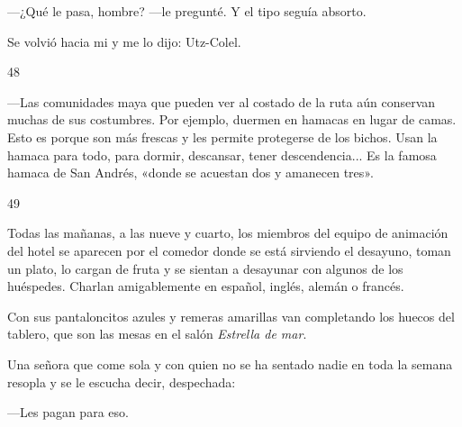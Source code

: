 \documentclass[12pt,twoside,openright,a5paper]{book}
\begin{document}
---¿Qué le pasa, hombre? ---le pregunté. Y el tipo seguía
absorto.

Se volvió hacia mi y me lo dijo: Utz-Colel.

\vspace{0.5cm}

\hrulefill \hspace{0.1cm}\decofourleft\hspace{0.2cm} 48 \hspace{0.2cm}\decofourright \hspace{0.1cm}\hrulefill

\nopagebreak

\vspace{0.5cm}

\nopagebreak

---Las comunidades maya que pueden ver al costado de la ruta aún conservan
muchas de sus costumbres. Por ejemplo, duermen en hamacas en lugar de
camas. Esto es porque son más frescas y les permite protegerse de los bichos. Usan la hamaca
para todo, para dormir, descansar, tener descendencia... Es la famosa hamaca de
San Andrés, «donde se acuestan dos y amanecen tres».

\vspace{0.5cm}

\hrulefill \hspace{0.1cm}\decofourleft\hspace{0.2cm} 49 \hspace{0.2cm}\decofourright \hspace{0.1cm}\hrulefill

\nopagebreak

\vspace{0.5cm}

\nopagebreak

Todas las mañanas, a las nueve y cuarto, los miembros del equipo de animación del
hotel se aparecen por el comedor donde se está sirviendo el desayuno, toman
un plato, lo cargan de fruta y se sientan a desayunar con algunos de los
huéspedes. Charlan amigablemente en español, inglés, alemán o francés.

Con sus pantaloncitos azules y remeras amarillas van completando los huecos
del tablero, que son las mesas en el salón \emph{Estrella de mar}.

Una señora que come sola y con quien no se ha sentado nadie en toda la
semana resopla y se le escucha decir, despechada:

---Les pagan para eso.

\vspace{0.5cm}
\end{document}
